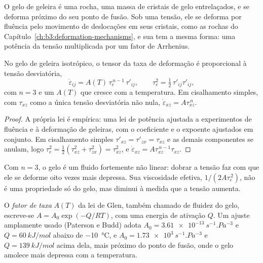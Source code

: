 O gelo de geleira é uma rocha, uma massa de cristais de gelo entrelaçados, e se deforma
próximo do seu ponto de fusão. Sob uma tensão, ele se deforma por fluência pelo
movimento de deslocações em seus cristais, como as rochas do
Capítulo~\ref{ch:b3:deformation-mechanisms}, e sua  tem a mesma
forma: uma potência da tensão multiplicada por um fator de Arrhenius.

\begin{theorem}\label{thm:b3:glaciology:glen}
No gelo de geleira isotrópico, o tensor da taxa de deformação é proporcional à
tensão desviatória,
\[
\dot\varepsilon_{ij} = A(T)\,\tau_e^{\,n-1}\,\tau'_{ij}, \qquad
\tau_e^2 = \tfrac12\,\tau'_{ij}\tau'_{ij},
\]
com $n = 3$ e um  $A(T)$ que cresce com a temperatura. Em
cisalhamento simples, com $\tau_{xz}$ como a única tensão desviatória não nula,
$\dot\varepsilon_{xz} = A\tau_{xz}^{\,n}$.
\end{theorem}

\begin{proof}
A própria lei é empírica: uma lei de potência ajustada a experimentos de fluência e
à deformação de geleiras, com o coeficiente e o expoente ajustados
em conjunto. Em cisalhamento simples $\tau'_{xz} = \tau'_{zx} = \tau_{xz}$ e as
demais componentes se anulam, logo $\tau_e^2 = \tfrac12(\tau_{xz}^2 +
\tau_{zx}^2) = \tau_{xz}^2$, e $\dot\varepsilon_{xz} = A\tau_{xz}^{\,n-1}
\tau_{xz}$.
\end{proof}

Com $n = 3$, o gelo é um fluido fortemente não linear: dobrar a tensão faz com que
ele se deforme oito vezes mais depressa. Sua viscosidade efetiva, $1/(2A\tau_e^{\,2})$,
não é uma propriedade só do gelo, mas diminui à medida que a tensão aumenta.

\begin{definition}\label{def:b3:glaciology:glen}
O \emph{fator de taxa} $A(T)$ da lei de Glen, também
chamado de fluidez do gelo, escreve-se $A = A_0\exp(-Q/RT)$, com uma
energia de ativação $Q$. Um ajuste amplamente usado (Paterson e Budd) adota $A_0 =
\qty{3.61e-13}{s^{-1}.Pa^{-3}}$ e $Q = \qty{60}{kJ/mol}$ abaixo de
\qty{-10}{\celsius}, e $A_0 = \qty{1.73e3}{s^{-1}.Pa^{-3}}$ e $Q =
\qty{139}{kJ/mol}$ acima dela, mais próximo do ponto de fusão, onde o gelo
amolece mais depressa com a temperatura.
\end{definition}

